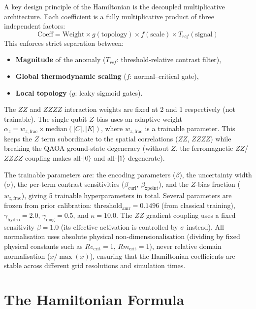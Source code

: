 \documentclass[12pt, a4paper, oneside]{report}
\begin{document}
A key design principle of the Hamiltonian is the decoupled multiplicative architecture. Each coefficient is a fully multiplicative product of three independent factors:
\begin{equation}
    \text{Coeff} = \text{Weight} \times g(\text{topology}) \times f(\text{scale}) \times T_{rcf}(\text{signal})
\end{equation}
This enforces strict separation between:
\begin{itemize}
    \item \textbf{Magnitude} of the anomaly ($T_{rcf}$: threshold-relative contrast filter),
    \item \textbf{Global thermodynamic scaling} ($f$: normal--critical gate),
    \item \textbf{Local topology} ($g$: leaky sigmoid gates).
\end{itemize}

The $ZZ$ and $ZZZZ$ interaction weights are fixed at 2 and 1 respectively (not trainable). The single-qubit $Z$ bias uses an adaptive weight $\alpha_z = w_{z,\text{frac}} \times \text{median}(|C|, |K|)$, where $w_{z,\text{frac}}$ is a trainable parameter. This keeps the $Z$ term subordinate to the spatial correlations ($ZZ$, $ZZZZ$) while breaking the QAOA ground-state degeneracy (without $Z$, the ferromagnetic $ZZ$/$ZZZZ$ coupling makes all-$\ket{0}$ and all-$\ket{1}$ degenerate).

The trainable parameters are: the encoding parameters ($\beta$), the uncertainty width ($\sigma$), the per-term contrast sensitivities ($\beta_{\text{curl}}$, $\beta_{\text{xpoint}}$), and the $Z$-bias fraction ($w_{z,\text{frac}}$), giving 5 trainable hyperparameters in total. Several parameters are frozen from prior calibration: $\text{threshold}_{\text{amr}} = 0.1496$ (from classical training), $\gamma_{\text{hydro}} = 2.0$, $\gamma_{\text{mag}} = 0.5$, and $\kappa = 10.0$. The $ZZ$ gradient coupling uses a fixed sensitivity $\beta = 1.0$ (its effective activation is controlled by $\sigma$ instead). All normalisation uses absolute physical non-dimensionalisation (dividing by fixed physical constants such as $Re_{\text{crit}} = 1$, $Rm_{\text{crit}} = 1$), never relative domain normalisation ($x / \max(x)$), ensuring that the Hamiltonian coefficients are stable across different grid resolutions and simulation times.

\section{The Hamiltonian Formula}
\end{document}
